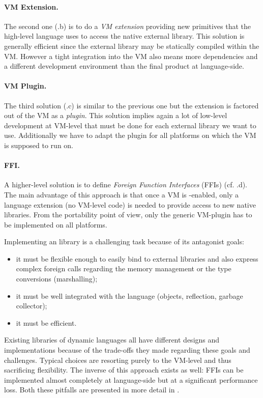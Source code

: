 \paragraph{VM Extension.}
The second one (.b) is to do a \emph{VM extension} providing new primitives that the high-level language uses to access the native external library.
This solution is generally efficient since the external library may be statically compiled within the VM.
However a tight integration into the VM also means more dependencies and a different development environment than the final product at language-side.

\paragraph{VM Plugin.}
The third solution (.c) is similar to the previous one but the extension is factored out of the VM as a \emph{plugin}.
This solution implies again a lot of low-level development at VM-level that must be done for each external library we want to use.
Additionally we have to adapt the plugin for all platforms on which the VM is supposed to run on.

\paragraph{FFI.}
A higher-level solution is to define \emph{Foreign Function Interfaces} (FFIs) (cf. .d).
The main advantage of this approach is that once a VM is \FFI-enabled, only a language extension (no VM-level code) is needed to provide access to new native libraries.
From the portability point of view, only the generic \FFI VM-plugin has to be implemented on all platforms.

Implementing an \FFI library is a challenging task because of its antagonist goals:
\begin{itemize}
    \item it must be flexible enough to easily bind to external libraries and also express complex foreign calls regarding the memory management or the type conversions (marshalling);
    \item it must be well integrated with the language (objects, reflection, garbage collector);
    \item it must be efficient.
\end{itemize}
%
Existing \FFI libraries of dynamic languages all have different designs and implementations because of the trade-offs they made regarding these goals and challenges.
Typical choices are resorting purely to the VM-level and thus sacrificing flexibility.
The inverse of this approach exists as well: FFIs can be implemented almost completely at language-side but at a significant performance loss.
Both these pitfalls are presented in more detail in .


